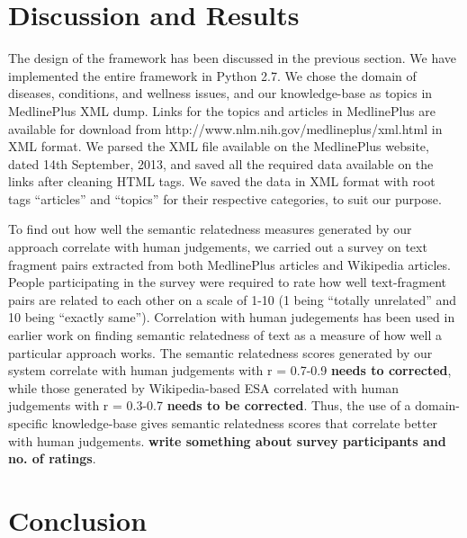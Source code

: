 \documentclass[conference]{IEEEtran}
\begin{document}

\section{Discussion and Results}

The design of the framework has been discussed in the previous section. We have implemented the entire framework in Python 2.7. We chose the domain of diseases, conditions, and wellness issues, and our knowledge-base as topics in MedlinePlus XML dump. Links for the topics and articles in MedlinePlus are available for download from http://www.nlm.nih.gov/medlineplus/xml.html in XML format. We parsed the XML file available on the MedlinePlus website, dated 14th September, 2013, and saved all the required data available on the links after cleaning HTML tags. We saved the data in XML format with root tags ``articles'' and ``topics'' for their respective categories, to suit our purpose.

To find out how well the semantic relatedness measures generated by our approach correlate with human judgements, we carried out a survey on text fragment pairs extracted from both MedlinePlus articles and Wikipedia articles. People participating in the survey were required to rate how well text-fragment pairs are related to each other on a scale of 1-10 (1 being ``totally unrelated'' and 10 being ``exactly same''). Correlation with human judegements has been used in earlier work on finding semantic relatedness of text as a measure of how well a particular approach works. The semantic relatedness scores generated by our system correlate with human judgements with r = 0.7-0.9 \textbf{needs to corrected}, while those generated by Wikipedia-based ESA correlated with human judgements with r = 0.3-0.7 \textbf{needs to be corrected}. Thus, the use of a domain-specific knowledge-base gives semantic relatedness scores that correlate better with human judgements. \textbf{write something about survey participants and no. of ratings}.

\section{Conclusion}
\end{document}
